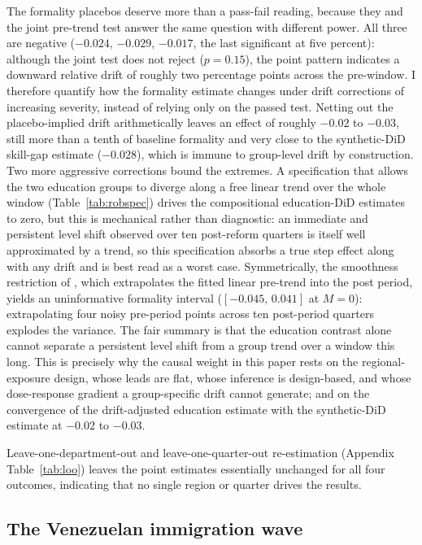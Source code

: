 The formality placebos deserve more than a pass-fail reading, because they and the joint pre-trend test answer the same question with different power. All three are negative ($-0.024$, $-0.029$, $-0.017$, the last significant at five percent): although the joint test does not reject ($p=0.15$), the point pattern indicates a downward relative drift of roughly two percentage points across the pre-window. I therefore quantify how the formality estimate changes under drift corrections of increasing severity, instead of relying only on the passed test. Netting out the placebo-implied drift arithmetically leaves an effect of roughly $-0.02$ to $-0.03$, still more than a tenth of baseline formality and very close to the synthetic-DiD skill-gap estimate ($-0.028$), which is immune to group-level drift by construction. Two more aggressive corrections bound the extremes. A specification that allows the two education groups to diverge along a free linear trend over the whole window (Table~\ref{tab:robspec}) drives the compositional education-DiD estimates to zero, but this is mechanical rather than diagnostic: an immediate and persistent level shift observed over ten post-reform quarters is itself well approximated by a trend, so this specification absorbs a true step effect along with any drift and is best read as a worst case. Symmetrically, the smoothness restriction of \citet{rambachan_roth_2023}, which extrapolates the fitted linear pre-trend into the post period, yields an uninformative formality interval ($[-0.045,\,0.041]$ at $M=0$): extrapolating four noisy pre-period points across ten post-period quarters explodes the variance. The fair summary is that the education contrast alone cannot separate a persistent level shift from a group trend over a window this long. This is precisely why the causal weight in this paper rests on the regional-exposure design, whose leads are flat, whose inference is design-based, and whose dose-response gradient a group-specific drift cannot generate; and on the convergence of the drift-adjusted education estimate with the synthetic-DiD estimate at $-0.02$ to $-0.03$.

Leave-one-department-out and leave-one-quarter-out re-estimation (Appendix Table~\ref{tab:loo}) leaves the point estimates essentially unchanged for all four outcomes, indicating that no single region or quarter drives the results.

\subsection{The Venezuelan immigration wave}

